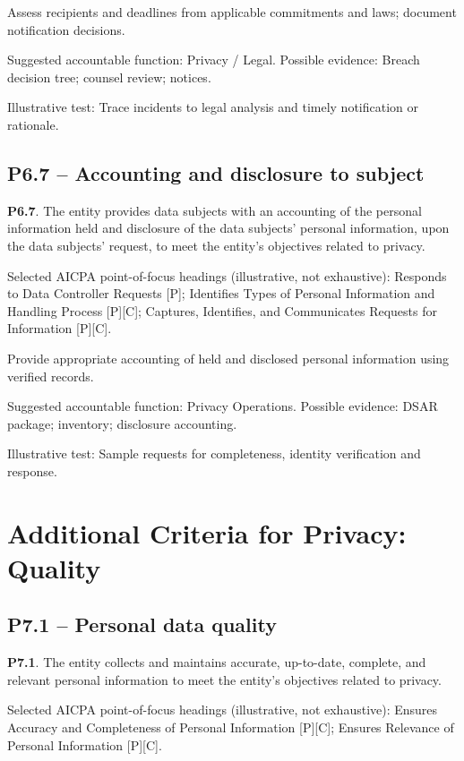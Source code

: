 \documentclass[10pt,oneside]{report}
\begin{document}
\begin{engineeringbox}
Assess recipients and deadlines from applicable commitments and laws; document notification decisions.
\end{engineeringbox}
Suggested accountable function: Privacy / Legal. Possible evidence: Breach decision tree; counsel review; notices.

Illustrative test: Trace incidents to legal analysis and timely notification or rationale.

\subsection*{P6.7 -- Accounting and disclosure to subject}
\begin{aicpabox}
\textbf{P6.7}. The entity provides data subjects with an accounting of the personal information held and disclosure of the data subjects' personal information, upon the data subjects' request, to meet the entity's objectives related to privacy.\par{}
\end{aicpabox}
Selected AICPA point-of-focus headings (illustrative, not exhaustive): Responds to Data Controller Requests [P]; Identifies Types of Personal Information and Handling Process [P][C]; Captures, Identifies, and Communicates Requests for Information [P][C].

\begin{engineeringbox}
Provide appropriate accounting of held and disclosed personal information using verified records.
\end{engineeringbox}
Suggested accountable function: Privacy Operations. Possible evidence: DSAR package; inventory; disclosure accounting.

Illustrative test: Sample requests for completeness, identity verification and response.

\section{Additional Criteria for Privacy: Quality}
\subsection*{P7.1 -- Personal data quality}
\begin{aicpabox}
\textbf{P7.1}. The entity collects and maintains accurate, up-to-date, complete, and relevant personal information to meet the entity's objectives related to privacy.\par{}
\end{aicpabox}
Selected AICPA point-of-focus headings (illustrative, not exhaustive): Ensures Accuracy and Completeness of Personal Information [P][C]; Ensures Relevance of Personal Information [P][C].
\end{document}
